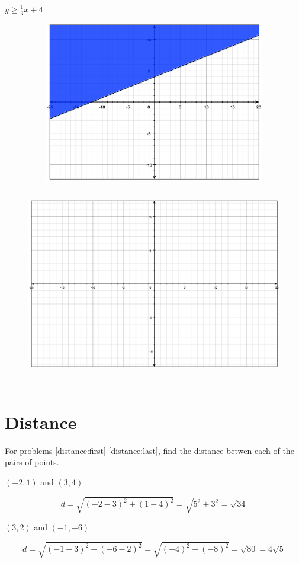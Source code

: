 \documentclass[fleqn,addpoints]{exam}
\begin{document}
\begin{questions}
\question[5] \( y \geq \frac{1}{3} x + 4\)
\label{graph:last}
\begin{figure}[H]
\ifprintanswers
  \includegraphics[width=12cm,height=7cm]{problem4}
\else
  \includegraphics[width=15cm,height=9cm]{axes}
\fi

\end{figure}

\section{Distance}
For problems \ref{distance:first}-\ref{distance:last}, find the distance betwen each of the pairs of points.

\question[5] $(-2, 1)$ and $(3, 4)$
\label{distance:first}
\begin{solution}[4 cm]
\[
  d = \sqrt{(-2-3)^2 + (1-4)^2} = \sqrt{5^2 + 3^2} = \sqrt{34}
\]
\end{solution}

\question[5] $(3, 2)$ and $(-1, -6)$
\label{distance:last}
\begin{solution}[4 cm]
\[
  d = \sqrt{(-1-3)^2 + (-6-2)^2} = \sqrt{(-4)^2 + (-8)^2} = \sqrt{80} = 4\sqrt{5}
\]
\end{solution}


\end{questions}
\end{document}
